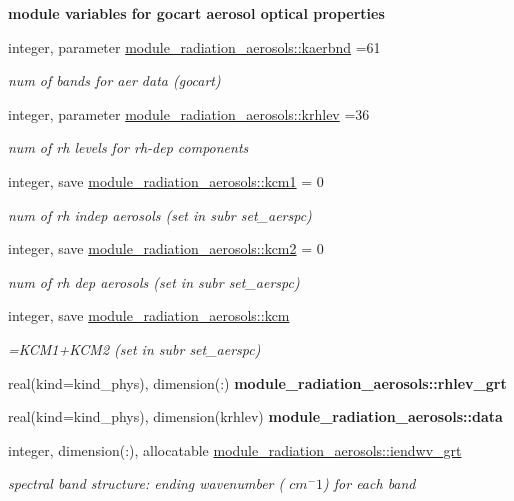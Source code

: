\begin{Indent}\textbf{ module variables for gocart aerosol optical properties}\par
\begin{DoxyCompactItemize}
\item 
integer, parameter \hyperlink{group__module__radiation__aerosols_gad345c77fc29d8b02de34990162645a66}{module\+\_\+radiation\+\_\+aerosols\+::kaerbnd} =61
\begin{DoxyCompactList}\small\item\em num of bands for aer data (gocart) \end{DoxyCompactList}\item 
integer, parameter \hyperlink{group__module__radiation__aerosols_ga33f2d4489a1730a27cbdc2e2add0f977}{module\+\_\+radiation\+\_\+aerosols\+::krhlev} =36
\begin{DoxyCompactList}\small\item\em num of rh levels for rh-\/dep components \end{DoxyCompactList}\item 
integer, save \hyperlink{group__module__radiation__aerosols_ga92b09dd26cc321af3b5da0b1c310a588}{module\+\_\+radiation\+\_\+aerosols\+::kcm1} = 0
\begin{DoxyCompactList}\small\item\em num of rh indep aerosols (set in subr set\+\_\+aerspc) \end{DoxyCompactList}\item 
integer, save \hyperlink{group__module__radiation__aerosols_gab2be28697a95bcec8d5cd8de7ebd4328}{module\+\_\+radiation\+\_\+aerosols\+::kcm2} = 0
\begin{DoxyCompactList}\small\item\em num of rh dep aerosols (set in subr set\+\_\+aerspc) \end{DoxyCompactList}\item 
integer, save \hyperlink{group__module__radiation__aerosols_ga4816bc93b826ff2fad9ff0805ea39fd5}{module\+\_\+radiation\+\_\+aerosols\+::kcm}
\begin{DoxyCompactList}\small\item\em =K\+C\+M1+\+K\+C\+M2 (set in subr set\+\_\+aerspc) \end{DoxyCompactList}\item 
real(kind=kind\+\_\+phys), dimension(\+:) {\bfseries module\+\_\+radiation\+\_\+aerosols\+::rhlev\+\_\+grt}
\item 
real(kind=kind\+\_\+phys), dimension(krhlev) {\bfseries module\+\_\+radiation\+\_\+aerosols\+::data}
\item 
integer, dimension(\+:), allocatable \hyperlink{group__module__radiation__aerosols_gac755c4235327053fff060ffa3b2ee2a3}{module\+\_\+radiation\+\_\+aerosols\+::iendwv\+\_\+grt}
\begin{DoxyCompactList}\small\item\em spectral band structure\+: ending wavenumber ( $cm^-1$) for each band \end{DoxyCompactList}\end{DoxyCompactItemize}
\end{Indent}
